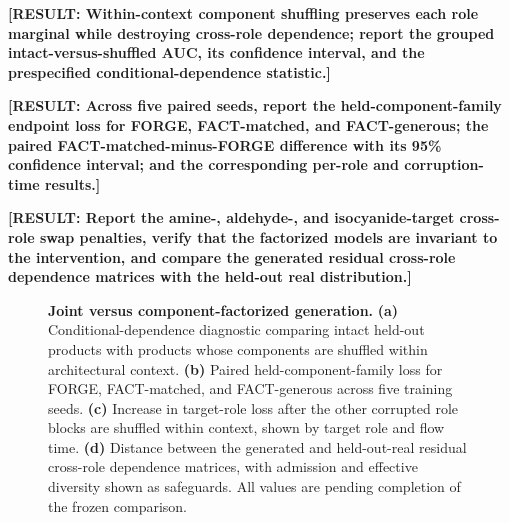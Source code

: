 \documentclass{article}
\newcommand{\PENDING}[1]{\textbf{[#1]}}
\newcommand{\FIGBOX}[1]{%
  \fbox{\begin{minipage}[c][#1][c]{\dimexpr\textwidth-2\fboxsep-2\fboxrule\relax}%
  \centering\textbf{[FIGURE IN PROGRESS]}%
  \end{minipage}}}
\begin{document}
\PENDING{RESULT: Within-context component shuffling preserves each role marginal while destroying
cross-role dependence; report the grouped intact-versus-shuffled AUC, its confidence interval, and the
prespecified conditional-dependence statistic.}

\PENDING{RESULT: Across five paired seeds, report the held-component-family endpoint loss for FORGE,
FACT-matched, and FACT-generous; the paired FACT-matched-minus-FORGE difference with its 95\% confidence
interval; and the corresponding per-role and corruption-time results.}

\PENDING{RESULT: Report the amine-, aldehyde-, and isocyanide-target cross-role swap penalties, verify
that the factorized models are invariant to the intervention, and compare the generated residual
cross-role dependence matrices with the held-out real distribution.}

\begin{figure}[h]
\centering
\FIGBOX{3.0in}
\caption{\textbf{Joint versus component-factorized generation.}
\textbf{(a)} Conditional-dependence diagnostic comparing intact held-out products with products whose
components are shuffled within architectural context.
\textbf{(b)} Paired held-component-family loss for FORGE, FACT-matched, and FACT-generous across five
training seeds.
\textbf{(c)} Increase in target-role loss after the other corrupted role blocks are shuffled within
context, shown by target role and flow time.
\textbf{(d)} Distance between the generated and held-out-real residual cross-role dependence matrices,
with admission and effective diversity shown as safeguards. All values are pending completion of the
frozen comparison.}
\label{fig:joint-factorized}
\end{figure}
\end{document}
